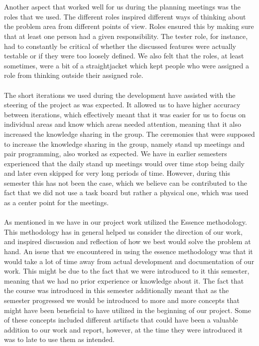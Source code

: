 \\\\
Another aspect that worked well for us during the planning meetings was the roles that we used. The different roles inspired different ways of thinking about the problem area from different points of view. Roles ensured this by making sure that at least one person had a given responsibility. The tester role, for instance, had to constantly be critical of whether the discussed features were actually testable or if they were too loosely defined. We also felt that the roles, at least sometimes, were a bit of a straightjacket which kept people who were assigned a role from thinking outside their assigned role.  
\\\\
The short iterations we used during the development have assisted with the steering of the project as was expected. It allowed us to have higher accuracy between iterations, which effectively meant that it was easier for us to focus on individual areas and know which areas needed attention, meaning that it also increased the knowledge sharing in the group. The  ceremonies that were supposed to increase the knowledge sharing in the group, namely stand up meetings and pair programming, also worked as expected. We have in earlier semesters experienced that the daily stand up meetings would over time stop being daily and later even skipped for very long periods of time. However, during this semester this has not been the case, which we believe can be contributed to the fact that we did not use a task board but rather a physical one, which was used as a center point for the meetings. 
\\\\
As mentioned in  we have in our project work utilized the Essence methodology. This methodology has in general helped us consider the direction of our work, and inspired discussion and reflection of how we best would solve the problem at hand. An issue that we encountered in using the essence methodology was that it would take a lot of time away from actual development and documentation of our work. This might be due to the fact that we were introduced to it this semester, meaning that we had no prior experience or knowledge about it. The fact that the course was introduced in this semester additionally meant that as the semester progressed we would be introduced to more and more concepts that might have been beneficial to have utilized in the beginning of our project. Some of these concepts included different artifacts that could have been a valuable addition to our work and report, however, at the time they were introduced it was to late to use them as intended.

